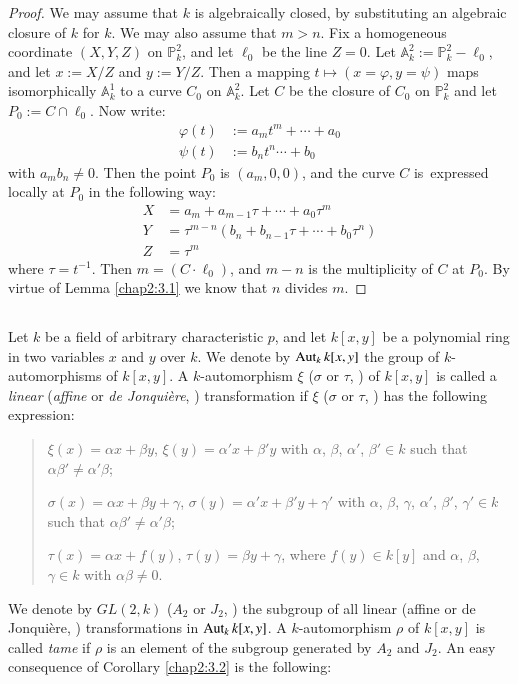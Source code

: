 \begin{proof}
We may assume that $k$ is algebraically closed, by substituting an
algebraic closure of $k$ for $k$. We may also assume that $m>n$. Fix a
homogeneous coordinate $(X,Y,Z)$ on $\mathbb{P}^{2}_{k}$, and let
$\ell_{0}$ be the line $Z=0$. Let
$\mathbb{A}^{2}_{k}:=\mathbb{P}^{2}_{k}-\ell_{0}$, and let $x:=X/Z$
and $y:=Y/Z$. Then a mapping $t\mapsto (x=\varphi,y=\psi)$ maps
isomorphically $\mathbb{A}^{1}_{k}$ to a curve $C_{0}$ on
$\mathbb{A}^{2}_{k}$. Let $C$ be the closure of $C_{0}$ on
$\mathbb{P}^{2}_{k}$ and let $P_{0}:=C\cap \ell_{0}$. Now write:
\begin{align*}
\varphi(t) &:= a_{m}t^{m}+\cdots+a_{0}\\
\psi(t) &:=b_{n}t^{n}\cdots+b_{0}
\end{align*}
with $a_{m}b_{n}\neq 0$. Then the point $P_{0}$ is $(a_{m},0,0)$, and
the curve $C$ is\pageoriginale\ \break expressed locally at $P_{0}$ in the
following way:
\begin{align*}
X &= a_{m}+a_{m-1}\tau+\cdots+a_{0}\tau^{m}\\
Y &= \tau^{m-n}(b_{n}+b_{n-1}\tau+\cdots+b_{0}\tau^{n})\\
Z &= \tau^{m}
\end{align*}
where $\tau=t^{-1}$. Then $m=(C\cdot\ell_{0})$, and $m-n$ is the
multiplicity of $C$ at $P_{0}$. By virtue of Lemma \ref{chap2:3.1} we
know that $n$ divides $m$.
\end{proof}

\subsection{}\label{chap2:3.3}
Let $k$ be a field of arbitrary characteristic $p$, and let $k[x,y]$
be a polynomial ring in two variables $x$ and $y$ over $k$. We denote
by $\operatorname{Aut}_{k}k[x,y]$ the group of $k$-automorphisms of $k[x,y]$. A
$k$-automorphism $\xi$ ($\sigma$ or $\tau$, \resp) of $k[x,y]$ is
called a {\em linear} ({\em affine} or {\em de Jonqui\`ere}, \resp)
transformation if $\xi$ ($\sigma$ or $\tau$, \resp) has the following
expression: 
\begin{quote}
$\xi(x)=\alpha x+\beta y$, $\xi(y)=\alpha'x+\beta'y$ with $\alpha$,
  $\beta$, $\alpha'$, $\beta'\in k$ such that $\alpha\beta'\neq
  \alpha'\beta$;

$\sigma(x)=\alpha x+\beta y+\gamma$,
  $\sigma(y)=\alpha'x+\beta'y+\gamma'$ with $\alpha$, $\beta$,
  $\gamma$, $\alpha'$, $\beta'$, $\gamma'\in k$ such that
  $\alpha\beta'\neq \alpha'\beta$;

$\tau(x)=\alpha x+f(y)$, $\tau(y)=\beta y+\gamma$, where $f(y)\in
  k[y]$ and $\alpha$, $\beta$, $\gamma\in k$ with $\alpha\beta\neq 0$.
\end{quote}
We denote by $GL(2,k)$ ($A_{2}$ or $J_{2}$, \resp) the subgroup of all
linear (affine or de Jonqui\`ere, \resp) transformations in
$\operatorname{Aut}_{k}k[x,y]$. A $k$-automorphism $\rho$ of $k[x,y]$ is called {\em
  tame} if $\rho$ is an element of the subgroup generated by $A_{2}$
and $J_{2}$. An easy consequence of Corollary \ref{chap2:3.2} is the
following:

